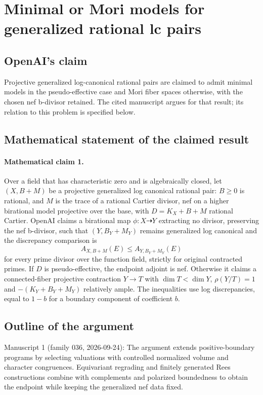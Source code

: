 \documentclass[11pt]{article}
\begin{document}
\section*{Minimal or Mori models for generalized rational lc pairs}

\subsection{OpenAI's claim}
Projective generalized log-canonical rational pairs are claimed to admit minimal models in the pseudo-effective case and Mori fiber spaces otherwise, with the chosen nef b-divisor retained. The cited manuscript argues for that result; its relation to this problem is specified below.

\subsection{Mathematical statement of the claimed result}
\paragraph{Mathematical claim 1.} Over a field that has characteristic zero and is algebraically closed, let $(X,B+M)$ be a projective generalized log canonical rational pair: $B\ge0$ is rational, and $M$ is the trace of a rational Cartier divisor, nef on a higher birational model projective over the base, with $D=K_X+B+M$ rational Cartier. OpenAI claims a birational map $\phi:X\dashrightarrow Y$ extracting no divisor, preserving the nef b-divisor, such that $(Y,B_Y+M_Y)$ remains generalized log canonical and the discrepancy comparison is
\[
A_{X,B+M}(E)\le A_{Y,B_Y+M_Y}(E)
\]
for every prime divisor over the function field, strictly for original contracted primes. If $D$ is pseudo-effective, the endpoint adjoint is nef. Otherwise it claims a connected-fiber projective contraction $Y\to T$ with $\dim T<\dim Y$, $\rho(Y/T)=1$ and $-(K_Y+B_Y+M_Y)$ relatively ample. The inequalities use log discrepancies, equal to $1-b$ for a boundary component of coefficient $b$.

\subsection{Outline of the argument}
Manuscript 1 (family 036, 2026-09-24): The argument extends positive-boundary programs by selecting valuations with controlled normalized volume and character congruences. Equivariant regrading and finitely generated Rees constructions combine with complements and polarized boundedness to obtain the endpoint while keeping the generalized nef data fixed.
\end{document}
